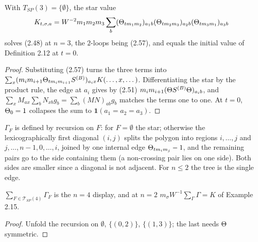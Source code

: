 \begin{lemma}[Tree representation at $n=3$, Example 2.16]\label{ex:2.16}
  \leanok
  With $T_{SP}(3)=\{\emptyset\}$, the star value
  \[ K_{t,\sigma,a}=W^{-2}m_1m_2m_3\sum_b(\Theta_{tm_1m_2})_{a_1b}(\Theta_{tm_2m_3})_{a_2b}
     (\Theta_{tm_3m_1})_{a_3b} \]
  solves (2.48) at $n=3$, the $2$-loops being (2.57), and equals the initial value of
  Definition 2.12 at $t=0$.
\end{lemma}
\begin{proof}\leanok{}
  Substituting (2.57) turns the three terms into
  $\sum_x(m_im_{i+1}\Theta_{tm_im_{i+1}}S^{(B)})_{a_ix}K(\dots,x,\dots)$.  Differentiating the star
  by the product rule, the edge at $a_i$ gives by (2.51)
  $m_im_{i+1}(\Theta S^{(B)}\Theta)_{a_ib}$, and $\sum_x M_{ax}\sum_bN_{xb}g_b=\sum_b(MN)_{ab}g_b$
  matches the terms one to one.  At $t=0$, $\Theta_0=1$ collapses the sum to
  $\mathbf 1(a_1=a_2=a_3)$.
\end{proof}

\begin{definition}\label{def:3.3-general}
  \leanok{}
  $\Gamma_F$ is defined by recursion on $F$: for $F=\emptyset$ the star; otherwise the
  lexicographically first diagonal $(i,j)$ splits the polygon into regions $i,\dots,j$ and
  $j,\dots,n-1,0,\dots,i$, joined by one internal edge $\Theta_{tm_im_j}-1$, and the remaining
  pairs go to the side containing them (a non-crossing pair lies on one side).  Both sides
  are smaller since a diagonal is not adjacent.  For $n\le2$ the tree is the single edge.
\end{definition}

\begin{lemma}[Acceptance at $n=4$; Lemma 3.4 at $n=2$]\label{lem:tree-accept}
  \leanok
  $\sum_{F\in\mathcal T_{SP}(4)}\Gamma_F$ is the $n=4$ display, and at $n=2$
  $m_\sigma W^{-1}\sum_\Gamma\Gamma = K$ of Example 2.15.
\end{lemma}
\begin{proof}\leanok{}
  Unfold the recursion on $\emptyset$, $\{(0,2)\}$, $\{(1,3)\}$; the last needs $\Theta$ symmetric.
\end{proof}

